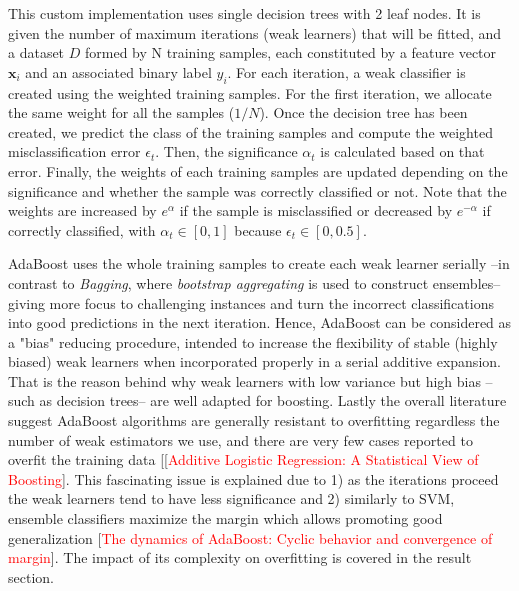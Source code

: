 \documentclass[conference]{IEEEtran}
\begin{document}
This custom implementation uses single decision trees with 2 leaf nodes. It is given the number of maximum iterations (weak learners) that will be fitted, and a dataset $D$ formed by N training samples, each constituted by a feature vector $\boldsymbol{x}_i$ and an associated binary label $y_i$. For each iteration, a weak classifier is created using the weighted training samples. For the first iteration, we allocate the same weight for all the samples ($1/N$). Once the decision tree has been created, we predict the class of the training samples and compute the weighted misclassification error $\epsilon_t$. Then, the significance $\alpha_t$ is calculated based on that error. Finally, the weights of each training samples are updated depending on the significance and whether the sample was correctly classified or not. Note that the weights are increased by $e^{\alpha}$ if the sample is misclassified or decreased by $e^{-\alpha}$ if correctly classified, with  $\alpha_t \in [0,1]$ because $\epsilon_t \in [0,0.5]$. 

AdaBoost uses the whole training samples to create each weak learner serially --in contrast to \textit{Bagging}, where \textit{bootstrap aggregating} is used to construct ensembles-- giving more focus to challenging instances and turn the incorrect classifications into good predictions in the next iteration. Hence, AdaBoost can be considered as a "bias" reducing procedure, intended to increase the flexibility of stable (highly biased) weak learners when incorporated properly in a serial additive expansion. That is the reason behind why weak learners with low variance but high bias --such as decision trees-- are well adapted for boosting. Lastly the overall literature suggest AdaBoost algorithms are generally resistant to overfitting regardless the number of weak estimators we use, and there are very few cases reported to overfit the training data [[\textcolor{red}{Additive Logistic Regression: A Statistical View of Boosting}]. This fascinating issue is explained due to 1) as the iterations proceed the weak learners tend to have less significance and 2) similarly to SVM, ensemble classifiers maximize the margin which allows promoting good generalization [\textcolor{red}{The dynamics of AdaBoost: Cyclic behavior and convergence of margin}]. The impact of its complexity on overfitting is covered in the result section.
\end{document}
